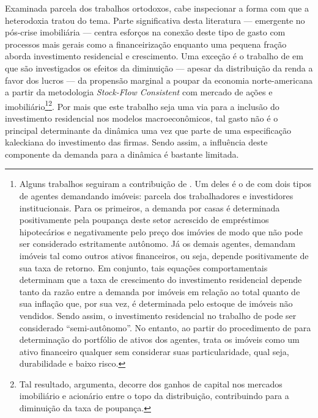 
Examinada parcela dos trabalhos ortodoxos, cabe inspecionar a forma com que a heterodoxia tratou do tema. 
Parte significativa desta literatura  --- emergente no pós-crise imobiliária --- centra esforços na conexão deste tipo de gasto com processos mais gerais como a financeirização \cites{aalbers_financialization_2008}{bibow_financialization_2010} enquanto uma pequena fração aborda investimento residencial e crescimento.
Uma exceção é o trabalho de \textcite{zezza_u.s._2008} em que são investigados os efeitos da diminuição --- apesar da distribuição da renda a favor dos lucros --- da propensão marginal a poupar da economia norte-americana a partir da metodologia \textit{Stock-Flow Consistent} com mercado de ações e imobiliário\footnote{
	Alguns trabalhos seguiram a contribuição de \textcite{zezza_u.s._2008}.
	Um deles é o de \textcite{nikolaidi_securitisation_2015} com dois tipos de agentes demandando imóveis: parcela dos trabalhadores e investidores institucionais.
	Para os primeiros, a demanda por casas é determinada positivamente pela poupança deste setor acrescido de empréstimos hipotecários e negativamente pelo preço dos imóvies de modo que não pode ser considerado estritamente autônomo.
	Já os demais agentes, demandam imóveis tal como outros ativos financeiros, ou seja, depende positivamente de sua taxa de retorno.
	Em conjunto, tais equações comportamentais determinam que a taxa de crescimento do investimento residencial depende tanto da razão entre a demanda por imóveis em relação ao total quanto de sua inflação que, por sua vez, é determinada pelo estoque de imóveis não vendidos.
	Sendo assim, o investimento residencial no trabalho de \textcite{nikolaidi_securitisation_2015} pode ser considerado ``semi-autônomo''.
	No entanto, ao partir do procedimento de \textcite{godley_money_1999} para determinação do portfólio de ativos dos agentes, trata os imóveis como um ativo financeiro qualquer sem considerar suas particularidade, qual seja, durabilidade e baixo risco.
}\footnote{
	Tal resultado, argumenta, decorre dos ganhos de capital nos mercados imobiliário e acionário entre o topo da distribuição, contribuindo para a diminuição da taxa de poupança.
}. 
Por mais que este trabalho seja uma via para a inclusão do investimento residencial nos modelos macroeconômicos, tal gasto não é o principal determinante da dinâmica uma vez que parte de uma especificação kaleckiana do investimento das firmas.
Sendo assim, a influência deste componente da demanda para a dinâmica é bastante limitada.


